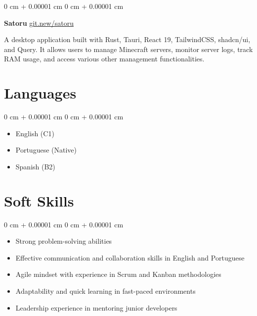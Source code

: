 \documentclass[10pt, letterpaper]{article}
\newenvironment{highlights}{ \begin{itemize}[ topsep=0.10 cm, parsep=0.10 cm, partopsep=0pt,
itemsep=0pt, leftmargin=0 cm + 10pt ] }{ \end{itemize} } %
\newenvironment{onecolentry}{ \begin{adjustwidth}{ 0 cm + 0.00001 cm }{ 0 cm + 0.00001 cm }
}{ \end{adjustwidth} } %
\newenvironment{twocolentry}[2][]{ \onecolentry \def\secondColumn{#2} \setcolumnwidth{\fill, 4.5 cm}
\begin{paracol}{2} }{ \switchcolumn \raggedleft \secondColumn \end{paracol}
\endonecolentry } %
\begin{document}
	\vspace{0.2cm}
	
	\begin{twocolentry}
		{\href{https://git.new/satoru}{git.new/satoru}} \textbf{Satoru}
	\end{twocolentry}
	
	\vspace{0.10cm}
	A desktop application built with Rust, Tauri, React 19, TailwindCSS, shadcn/ui,
	and Query. It allows users to manage Minecraft servers, monitor server logs,
	track RAM usage, and access various other management functionalities.
	
	\section{Languages}
	
	\begin{onecolentry}
		\begin{highlights}
			\item English (C1)
			\item Portuguese (Native)
			\item Spanish (B2)
		\end{highlights}
	\end{onecolentry}
	
	\section{Soft Skills}
	\begin{onecolentry}
		\begin{highlights}
			\item Strong problem-solving abilities
			\item Effective communication and collaboration skills in English and Portuguese
			\item Agile mindset with experience in Scrum and Kanban methodologies
			\item Adaptability and quick learning in fast-paced environments
			\item Leadership experience in mentoring junior developers
		\end{highlights}
	\end{onecolentry}
	
\end{document}
